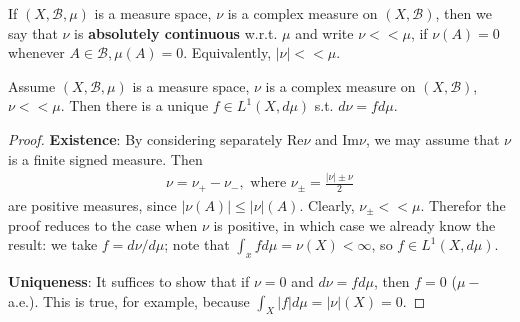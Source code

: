 \fi
\begin{definition}
    If \((X,\mathscr{B},\mu)\) is a measure space, \(\nu\) is a complex measure on \((X,\mathscr{B})\), then we say that \(\nu\) is \textbf{absolutely continuous} w.r.t. \(\mu\) and write \(\nu<<\mu\), if \(\nu(A)=0\) whenever \(A\in\mathscr{B}, \mu(A)=0\). Equivalently, \(|\nu|<<\mu\).
\end{definition}
\begin{theorem}
    Assume \((X,\mathscr{B}, \mu)\) is a measure space, \(\nu\) is a complex measure on \((X,\mathscr{B})\), \(\nu<<\mu\). Then there is a unique \(f\in L^1(X,d\mu)\) s.t. \(d\nu = fd\mu\).
\end{theorem}
\ifdetailed
\begin{proof}
    \textbf{Existence}: By considering separately Re\(\nu\) and Im\(\nu\), we may assume that \(\nu\) is a finite signed measure. Then 
    \begin{align*}
        \nu = \nu_{+} - \nu_{-}, \text{ where } \nu_{\pm} = \frac{|\nu|\pm\nu}{2}
    \end{align*}
    are positive measures, since \(|\nu(A)| \leq |\nu|(A)\). Clearly, \(\nu_{\pm}<<\mu\). Therefor the proof reduces to the case when \(\nu\) is positive, in which case we already know the result: we take \(f=d\nu/d\mu\); note that \(\int_x fd\mu=\nu(X)<\infty\), so \(f\in L^1(X,d\mu)\).

    \textbf{Uniqueness}: It suffices to show that if \(\nu=0\) and \(d\nu=fd\mu\), then \(f=0\) (\(\mu-\)a.e.). This is true, for example, because \(\int_X|f|d\mu = |\nu|(X)=0\).
\end{proof}
\fi 